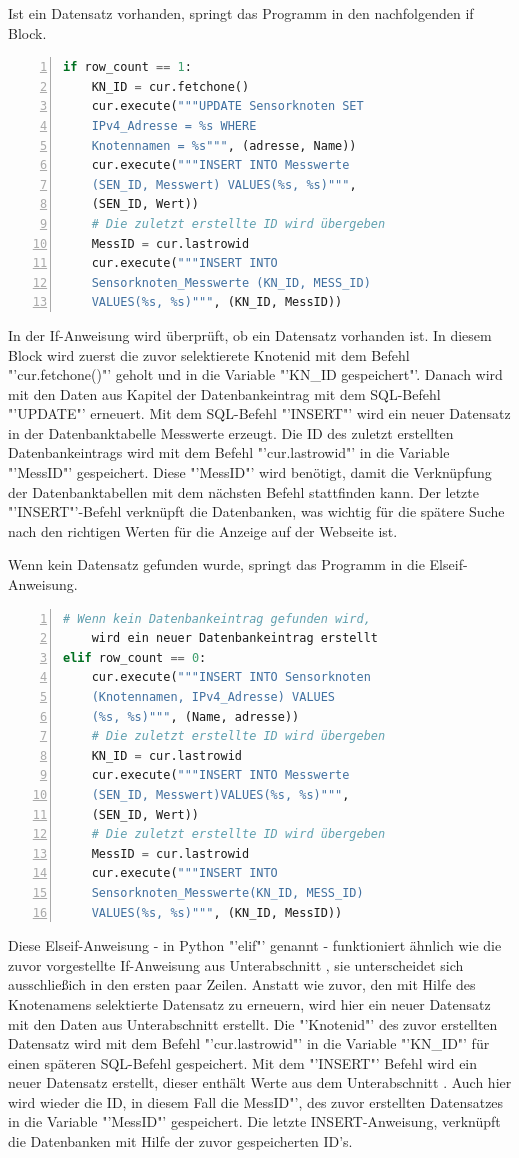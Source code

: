 Ist ein Datensatz vorhanden, springt das Programm in den nachfolgenden if Block.
\begin{lstlisting}[caption=If-Anweisung des Befüllen der Datenbank,frame=single,numbers=left,language=Python,showstringspaces=false]
if row_count == 1:
	KN_ID = cur.fetchone()
	cur.execute("""UPDATE Sensorknoten SET
	IPv4_Adresse = %s WHERE
	Knotennamen = %s""", (adresse, Name))
	cur.execute("""INSERT INTO Messwerte 
	(SEN_ID, Messwert) VALUES(%s, %s)""",
	(SEN_ID, Wert))
	# Die zuletzt erstellte ID wird übergeben
	MessID = cur.lastrowid
	cur.execute("""INSERT INTO 
	Sensorknoten_Messwerte (KN_ID, MESS_ID)
	VALUES(%s, %s)""", (KN_ID, MessID))
\end{lstlisting}\label{If-Anweisung}
 In der If-Anweisung wird überprüft, ob ein Datensatz vorhanden ist. In diesem Block wird zuerst die zuvor selektierete Knotenid mit dem Befehl "'cur.fetchone()"' geholt und in die Variable "'KN\_ID gespeichert"'. Danach wird mit den Daten aus Kapitel  der Datenbankeintrag mit dem SQL-Befehl "'UPDATE"' erneuert. Mit dem SQL-Befehl "'INSERT"' wird ein neuer Datensatz in der Datenbanktabelle Messwerte erzeugt. Die ID des zuletzt erstellten Datenbankeintrags wird mit dem Befehl "'cur.lastrowid"' in die Variable "'MessID"' gespeichert. Diese "'MessID"' wird benötigt, damit die Verknüpfung der Datenbanktabellen mit dem nächsten Befehl stattfinden kann. Der letzte "'INSERT"'-Befehl verknüpft die Datenbanken, was wichtig für die spätere Suche nach den richtigen Werten für die Anzeige auf der Webseite ist.
 
 Wenn kein Datensatz gefunden wurde, springt das Programm in die Elseif-Anweisung. 
\begin{lstlisting}[caption=Ifelse-Anweisung des Befüllen der Datenbank,frame=single,numbers=left,language=Python,showstringspaces=false]
	# Wenn kein Datenbankeintrag gefunden wird,
	wird ein neuer Datenbankeintrag erstellt
elif row_count == 0:
	cur.execute("""INSERT INTO Sensorknoten
	(Knotennamen, IPv4_Adresse) VALUES
	(%s, %s)""", (Name, adresse))
	# Die zuletzt erstellte ID wird übergeben
	KN_ID = cur.lastrowid
	cur.execute("""INSERT INTO Messwerte
	(SEN_ID, Messwert)VALUES(%s, %s)""",
	(SEN_ID, Wert))
	# Die zuletzt erstellte ID wird übergeben
	MessID = cur.lastrowid
	cur.execute("""INSERT INTO 
	Sensorknoten_Messwerte(KN_ID, MESS_ID)
	VALUES(%s, %s)""", (KN_ID, MessID))
\end{lstlisting}
 Diese Elseif-Anweisung - in Python "'elif"' genannt - funktioniert ähnlich wie die zuvor vorgestellte If-Anweisung aus Unterabschnitt , sie unterscheidet sich ausschließich in den ersten paar Zeilen. Anstatt wie zuvor, den mit Hilfe des Knotenamens selektierte Datensatz zu erneuern, wird hier ein neuer Datensatz mit den Daten aus Unterabschnitt  erstellt. Die "'Knotenid"' des zuvor erstellten Datensatz wird mit dem Befehl "'cur.lastrowid"' in die Variable "'KN\_ID"' für einen späteren SQL-Befehl gespeichert. Mit dem "'INSERT"' Befehl wird ein neuer Datensatz erstellt, dieser enthält Werte aus dem Unterabschnitt . Auch hier wird wieder die ID, in diesem Fall die MessID"', des zuvor erstellten Datensatzes in die Variable "'MessID"' gespeichert. Die letzte INSERT-Anweisung, verknüpft die Datenbanken mit Hilfe der zuvor gespeicherten ID's.

